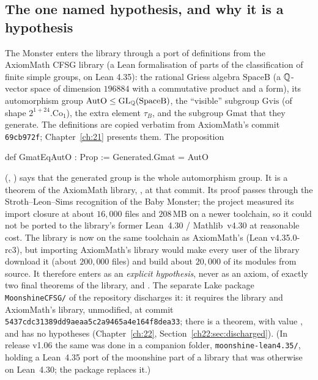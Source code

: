 \subsection{The one named hypothesis, and why it is a hypothesis}\label{ch16:sec:gmat}

The Monster enters the library through a port of definitions from the AxiomMath CFSG library (a Lean formalisation
of parts of the classification of finite simple groups, on Lean 4.35): the rational Griess algebra
$\mathrm{SpaceB}$ (a ${\mathbb{Q}}$-vector space of dimension $196884$ with a commutative product and a form), its
automorphism group $\mathrm{AutO}\le\mathrm{GL}_{\mathbb{Q}}(\mathrm{SpaceB})$, the ``visible'' subgroup $\mathrm{Gvis}$ (of
shape $2^{1+24}.\mathrm{Co}_1$), the extra element $\tau_B$, and the subgroup $\mathrm{Gmat}$ that they generate.  The
definitions are copied verbatim from AxiomMath's commit \texttt{69cb972f}; Chapter~\ref{ch:21} presents them.  The
proposition
\begin{leancode}
def GmatEqAutO : Prop :=
  Generated.Gmat = AutO
\end{leancode}
(, ) says that the
generated group is the whole automorphism group.  It is a theorem of the AxiomMath library,
, at that commit.  Its proof passes through the
Stroth--Leon--Sims recognition of the Baby Monster; the project measured its import closure at about $16{,}000$ files
and $208$\,MB on a newer toolchain, so it could not be ported to the
library's former Lean~4.30 / Mathlib~v4.30 at reasonable cost.  The library is now on the same toolchain as AxiomMath's
(Lean v4.35.0-rc3), but importing AxiomMath's library would make every user of the library download it (about
$200{,}000$ files) and build about $20{,}000$ of its modules from source.  It therefore enters as an \emph{explicit
hypothesis}, never as an axiom, of exactly two final theorems of the library,  and
.  The separate Lake package \texttt{MoonshineCFSG/} of the repository discharges it: it
requires the library and AxiomMath's library, unmodified, at commit \texttt{5437cdc31389dd9aeaa5c2a9465a4e164f8dea33};
there  is a theorem, with value , and
 has no hypotheses (Chapter~\ref{ch:22}, Section~\ref{ch22:sec:discharged}).
(In release v1.06 the same was done in a companion folder, \texttt{moonshine-lean4.35/}, holding a Lean~4.35 port of the
moonshine part of a library that was otherwise on Lean~4.30; the package replaces it.)

